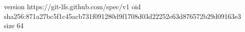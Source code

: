 version https://git-lfs.github.com/spec/v1
oid sha256:871a27bc5f1c45acb731f091280d9f1708d03d22252e63d876572b29d09163e3
size 64
